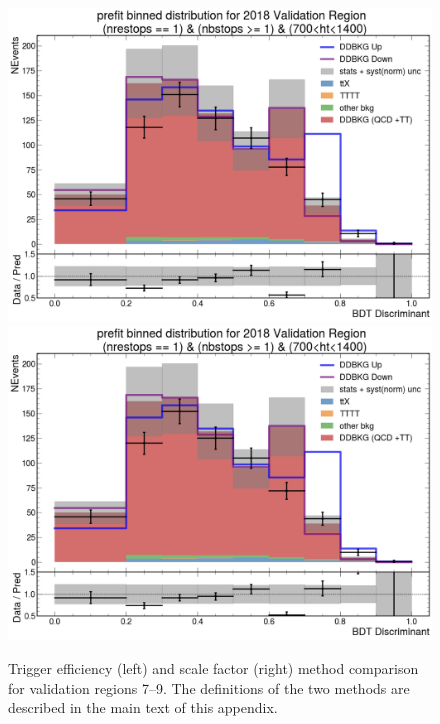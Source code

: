 \documentclass[twoside]{article}
\begin{document}
\begin{figure}[!t]
    \includegraphics[width=.45\columnwidth]{plots/Trigger/TriggerReview/eff9.png}
    \includegraphics[width=.45\columnwidth]{plots/Trigger/TriggerReview/SF9.png}

    \caption{
        Trigger efficiency (left) and scale factor (right) method comparison for validation regions 7–9.  
        The definitions of the two methods are described in the main text of this appendix.
    }
\end{figure}
\end{document}
